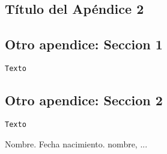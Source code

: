 \documentclass[spanish,a4paper,11pt,twoside]{report}
\begin{document}
\begin{appendix}
\chapter{Título del Apéndice 2}
\label{appendix:2}
\section{Otro apendice: Seccion 1}
\label{Apendice2:label}

\begin{center}
\begin{footnotesize}

\begin{verbatim}
Texto
\end{verbatim}

\end{footnotesize}
\end{center}

\section{Otro apendice: Seccion 2}
\label{Apendice2:label2}

\begin{center}
\begin{footnotesize}

\begin{verbatim}
Texto
\end{verbatim}


\end{footnotesize}
\end{center}

%

\end{appendix}

\begin{thebibliography}{00}
    Nombre.
    Fecha nacimiento. 
  	nombre, ...
 \end{thebibliography}




%
\nocite{*}



\end{document}

